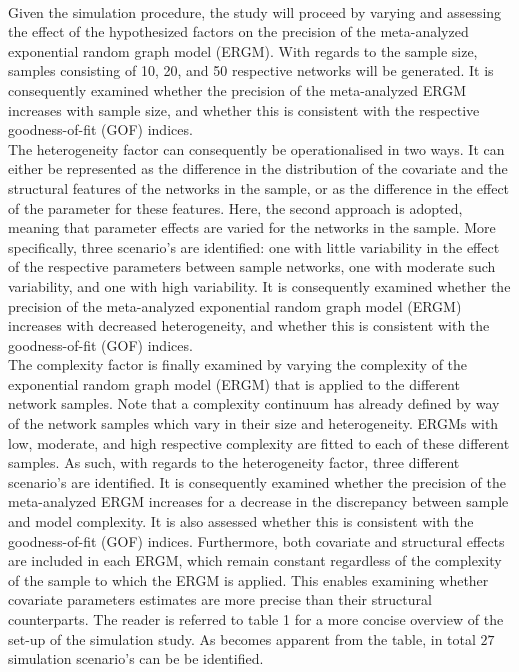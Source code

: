 \documentclass[a4paper, man, floatsintext]{apa6}
\begin{document}
\\ 
\clearpage Given the simulation procedure, the study will proceed by varying and assessing the effect of the hypothesized factors on the precision of the meta-analyzed exponential random graph model (ERGM). With regards to the sample size, samples consisting of 10, 20, and 50 respective networks will be generated.  It is consequently examined whether the precision of the meta-analyzed ERGM increases with sample size, and whether this is consistent with the respective goodness-of-fit (GOF) indices.
\\
The heterogeneity factor can consequently be operationalised in two ways. It can either be represented as the difference in the distribution of the covariate and the structural features of the networks in the sample, or as the difference in the effect of the parameter for these features. Here, the second approach is adopted, meaning that parameter effects are varied for the networks in the sample. More specifically, three scenario's are identified: one with little variability in the effect of the respective parameters between sample networks, one with moderate such variability, and one with high variability. It is consequently examined whether the precision of the meta-analyzed exponential random graph model (ERGM) increases with decreased heterogeneity, and whether this is consistent with the goodness-of-fit (GOF) indices. 
\\
The complexity factor is finally examined by varying the complexity of the exponential random graph model (ERGM) that is applied to the different network samples. Note that a complexity continuum has already defined by way of the network samples which vary in their size and heterogeneity. ERGMs with low, moderate, and high respective complexity are fitted to each of these different samples. As such, with regards to the heterogeneity factor, three different scenario's are identified. It is consequently examined whether the precision of the meta-analyzed ERGM increases for a decrease in the discrepancy between sample and model complexity. It is also assessed whether this is consistent with the goodness-of-fit (GOF) indices. Furthermore, both covariate and structural effects are included in each ERGM, which remain constant regardless of the complexity of the sample to which the ERGM is applied. This enables examining whether covariate parameters estimates are more precise than their structural counterparts. \clearpage \noindent The reader is referred to table 1 for a more concise overview of the set-up of the simulation study. As becomes apparent from the table, in total $27$  simulation scenario's can be be identified.
\end{document}
